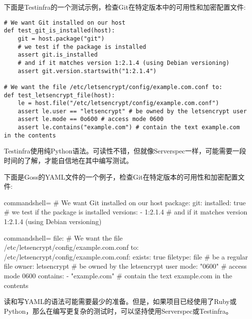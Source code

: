 下面是Testinfra的一个测试示例，检查Git在特定版本中的可用性和加密配置文件:

\begin{lstlisting}[style=stylePython]
# We want Git installed on our host
def test_git_is_installed(host):
	git = host.package("git")
	# we test if the package is installed
	assert git.is_installed
	# and if it matches version 1:2.1.4 (using Debian versioning)
	assert git.version.startswith("1:2.1.4")

# We want the file /etc/letsencrypt/config/example.com.conf to:
def test_letsencrypt_file(host):
	le = host.file("/etc/letsencrypt/config/example.com.conf")
	assert le.user == "letsencrypt" # be owned by the letsencrypt user
	assert le.mode == 0o600 # access mode 0600
	assert le.contains("example.com") # contain the text example.com in the contents
\end{lstlisting}

Testinfra使用纯Python语法。可读性不错，但就像Serverspec一样，可能需要一段时间的了解，才能自信地在其中编写测试。


下面是Goss的YAML文件的一个例子，检查Git在特定版本的可用性和加密配置文件:

\begin{tcblisting}{commandshell={}}
# We want Git installed on our host
package:
  git:
    installed: true # we test if the package is installed
  versions:
  - 1:2.1.4 # and if it matches version 1:2.1.4 (using Debian versioning)
\end{tcblisting}
\begin{tcblisting}{commandshell={}}
file:
  # We want the file /etc/letsencrypt/config/example.com.conf to:
  /etc/letsencrypt/config/example.com.conf:
    exists: true
  filetype: file # be a regular file
  owner: letsencrypt # be owned by the letsencrypt user
  mode: "0600" # access mode 0600
  contains:
  - "example.com" # contain the text example.com in the contents
\end{tcblisting}

读和写YAML的语法可能需要最少的准备。但是，如果项目已经使用了Ruby或Python，那么在编写更复杂的测试时，可以坚持使用Serverspec或Testinfra。









